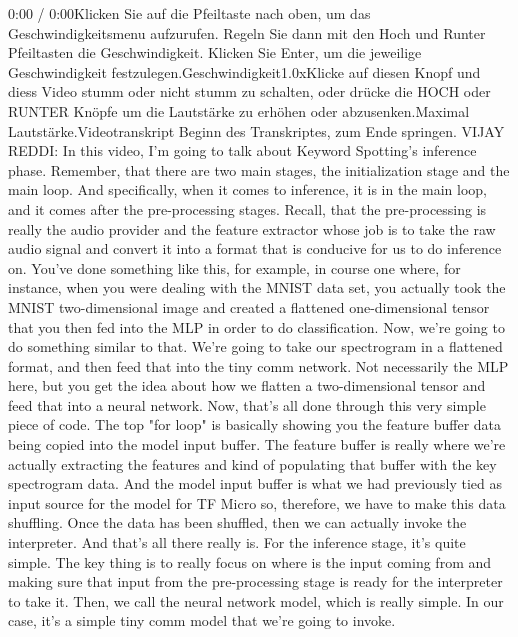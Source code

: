     0:00 / 0:00Klicken Sie auf die Pfeiltaste nach oben, um das Geschwindigkeitsmenu aufzurufen. Regeln Sie dann mit den Hoch und Runter Pfeiltasten die Geschwindigkeit. Klicken Sie Enter, um die jeweilige Geschwindigkeit festzulegen.Geschwindigkeit1.0xKlicke auf diesen Knopf und diess Video stumm oder nicht stumm zu schalten, oder drücke die HOCH oder RUNTER Knöpfe um die Lautstärke zu erhöhen oder abzusenken.Maximal Lautstärke.Videotranskript
    Beginn des Transkriptes, zum Ende springen.
    VIJAY REDDI: In this video, I'm going to talk about Keyword Spotting's
    inference phase.
    Remember, that there are two main stages, the initialization
    stage and the main loop.
    And specifically, when it comes to inference, it is in the main loop,
    and it comes after the pre-processing stages.
    Recall, that the pre-processing is really
    the audio provider and the feature extractor whose job is
    to take the raw audio signal and convert it into a format that
    is conducive for us to do inference on.
    You've done something like this, for example,
    in course one where, for instance, when you were dealing with the MNIST data
    set, you actually took the MNIST two-dimensional image
    and created a flattened one-dimensional tensor that you then fed into the MLP
    in order to do classification.
    Now, we're going to do something similar to that.
    We're going to take our spectrogram in a flattened format,
    and then feed that into the tiny comm network.
    Not necessarily the MLP here, but you get
    the idea about how we flatten a two-dimensional tensor
    and feed that into a neural network.
    Now, that's all done through this very simple piece of code.
    The top "for loop" is basically showing you the feature buffer data being
    copied into the model input buffer.
    The feature buffer is really where we're actually
    extracting the features and kind of populating that buffer
    with the key spectrogram data.
    And the model input buffer is what we had previously
    tied as input source for the model for TF Micro
    so, therefore, we have to make this data shuffling.
    Once the data has been shuffled, then we can actually invoke the interpreter.
    And that's all there really is.
    For the inference stage, it's quite simple.
    The key thing is to really focus on where
    is the input coming from and making sure that input
    from the pre-processing stage is ready for the interpreter to take it.
    Then, we call the neural network model, which is really simple.
    In our case, it's a simple tiny comm model that we're going to invoke.
